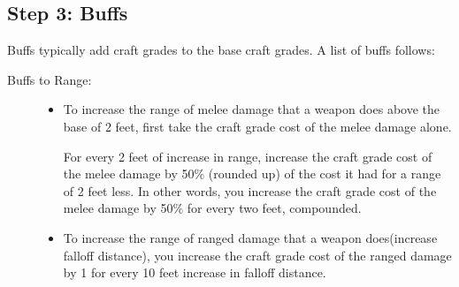 \subsection{Step 3: Buffs}
Buffs typically add craft grades to the base craft grades. A list of buffs follows:
\begin{description}
	\item[Buffs to Range:] \hfill
	\begin{itemize}
		\item To increase the range of melee damage that a weapon does above the base of 2 feet, first take the craft grade cost of the melee damage alone.
		
		For every 2 feet of increase in range, increase the craft grade cost of the melee damage by 50\% (rounded up) of the cost it had for a range of 2 feet less. In other words, you increase the craft grade cost of the melee damage by 50\% for every two feet, compounded.
		
		\item To increase the range of ranged damage that a weapon does(increase falloff distance), you increase the craft grade cost of the ranged damage by 1 for every 10 feet increase in falloff distance.
		

\end{itemize}
\end{description}
